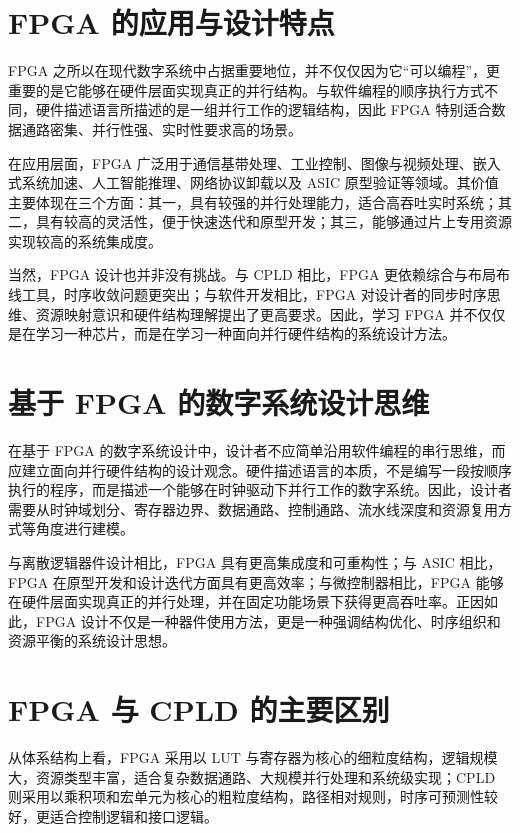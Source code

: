 \section{FPGA
的应用与设计特点}\label{fpga-ux7684ux5e94ux7528ux4e0eux8bbeux8ba1ux7279ux70b9}

FPGA
之所以在现代数字系统中占据重要地位，并不仅仅因为它``可以编程''，更重要的是它能够在硬件层面实现真正的并行结构。与软件编程的顺序执行方式不同，硬件描述语言所描述的是一组并行工作的逻辑结构，因此
FPGA 特别适合数据通路密集、并行性强、实时性要求高的场景。

在应用层面，FPGA
广泛用于通信基带处理、工业控制、图像与视频处理、嵌入式系统加速、人工智能推理、网络协议卸载以及
ASIC
原型验证等领域。其价值主要体现在三个方面：其一，具有较强的并行处理能力，适合高吞吐实时系统；其二，具有较高的灵活性，便于快速迭代和原型开发；其三，能够通过片上专用资源实现较高的系统集成度。

当然，FPGA 设计也并非没有挑战。与 CPLD 相比，FPGA
更依赖综合与布局布线工具，时序收敛问题更突出；与软件开发相比，FPGA
对设计者的同步时序思维、资源映射意识和硬件结构理解提出了更高要求。因此，学习
FPGA
并不仅仅是在学习一种芯片，而是在学习一种面向并行硬件结构的系统设计方法。

\section{基于 FPGA
的数字系统设计思维}\label{ux57faux4e8e-fpga-ux7684ux6570ux5b57ux7cfbux7edfux8bbeux8ba1ux601dux7ef4}

在基于 FPGA
的数字系统设计中，设计者不应简单沿用软件编程的串行思维，而应建立面向并行硬件结构的设计观念。硬件描述语言的本质，不是编写一段按顺序执行的程序，而是描述一个能够在时钟驱动下并行工作的数字系统。因此，设计者需要从时钟域划分、寄存器边界、数据通路、控制通路、流水线深度和资源复用方式等角度进行建模。

与离散逻辑器件设计相比，FPGA 具有更高集成度和可重构性；与 ASIC
相比，FPGA 在原型开发和设计迭代方面具有更高效率；与微控制器相比，FPGA
能够在硬件层面实现真正的并行处理，并在固定功能场景下获得更高吞吐率。正因如此，FPGA
设计不仅是一种器件使用方法，更是一种强调结构优化、时序组织和资源平衡的系统设计思想。

\section{FPGA 与 CPLD
的主要区别}\label{fpga-ux4e0e-cpld-ux7684ux4e3bux8981ux533aux522b}

从体系结构上看，FPGA 采用以 LUT
与寄存器为核心的细粒度结构，逻辑规模大，资源类型丰富，适合复杂数据通路、大规模并行处理和系统级实现；CPLD
则采用以乘积项和宏单元为核心的粗粒度结构，路径相对规则，时序可预测性较好，更适合控制逻辑和接口逻辑。

